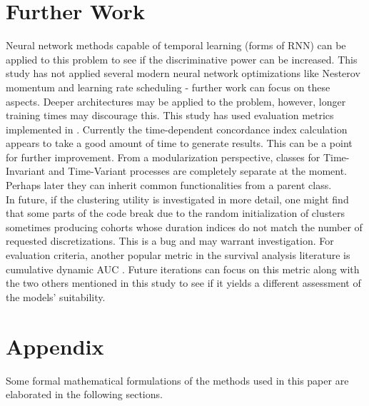 \documentclass[%
 reprint,
 amsmath,amssymb,
 aps,nofootinbib
]{revtex4-2}
\begin{document}

\section{\label{morework}Further Work}
Neural network methods capable of temporal learning (forms of RNN) can be applied to this problem to see if the discriminative power can be increased. This study has not applied several modern neural network optimizations like Nesterov momentum and learning rate scheduling - further work can focus on these aspects. Deeper architectures may be applied to the problem, however, longer training times may discourage this. This study has used evaluation metrics implemented in \cite{kvamme_continuous_2019}. Currently the time-dependent concordance index calculation appears to take a good amount of time to generate results. This can be a point for further improvement. From a modularization perspective, classes for Time-Invariant and Time-Variant processes are completely separate at the moment. Perhaps later they can inherit common functionalities from a parent class.\\

In future, if the clustering utility is investigated in more detail, one might find that some parts of the code break due to the random initialization of clusters sometimes producing cohorts whose duration indices do not match the number of requested discretizations. This is a bug and may warrant investigation. For evaluation criteria, another popular metric in the survival analysis literature is cumulative dynamic AUC \cite{cum_dyn_auc}. Future iterations can focus on this metric along with the two others mentioned in this study to see if it yields a different assessment of the models' suitability.

\appendix

\section{\label{appdx}Appendix}

Some formal mathematical formulations of the methods used in this paper are elaborated in the following sections.
\end{document}
